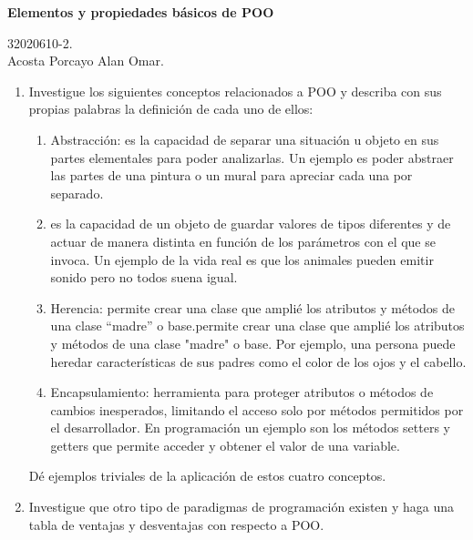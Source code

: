 \documentclass[12pt]{article}
\begin{document}
    \begin{center}
        \large \textbf{Elementos y propiedades básicos de POO}
    \end{center}
    
    \begin{flushright}
        32020610-2. \\
        Acosta Porcayo Alan Omar.
    \end{flushright}

    \begin{enumerate}[leftmargin=*]
        \item Investigue los siguientes conceptos relacionados a POO y describa con sus propias palabras la definición de cada uno de ellos:
        \begin{enumerate}[leftmargin=*]
            \item Abstracción: es la capacidad de separar una situación u objeto en sus partes elementales para poder analizarlas. Un ejemplo es poder abstraer las partes de una pintura o un mural para apreciar cada una por separado.
            \item es la capacidad de un objeto de guardar valores de tipos diferentes y de actuar de manera distinta en función de los parámetros con el que se invoca. Un ejemplo de la vida real es que los animales pueden emitir sonido pero no todos suena igual. 
            \item Herencia: permite crear una clase que amplié los atributos y métodos de una clase ``madre'' o base.permite crear una clase que amplié los atributos y métodos de una clase "madre" o base. Por ejemplo, una persona puede heredar características de sus padres como el color de los ojos y el cabello.
            \item Encapsulamiento: herramienta para proteger atributos o métodos de cambios inesperados, limitando el acceso solo por métodos permitidos por el desarrollador. En programación un ejemplo son los métodos setters y getters que permite acceder y obtener el valor de una variable.
        \end{enumerate}
        Dé ejemplos triviales de la aplicación de estos cuatro conceptos.

        \item Investigue que otro tipo de paradigmas de programación existen y haga una tabla de ventajas y desventajas con respecto a POO.


\end{enumerate}
\end{document}
